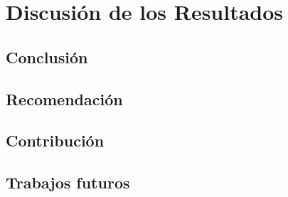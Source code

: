\section{Discusión de los Resultados}

\subsection{Conclusión}

\subsection{Recomendación}

\subsection{Contribución}

\subsection{Trabajos futuros}
